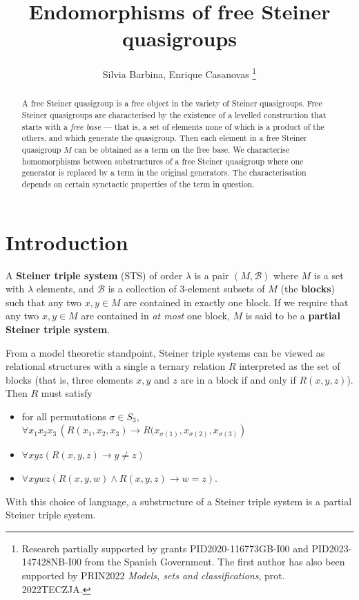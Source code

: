 \documentclass[a4paper, 11pt]{article}
\title{Endomorphisms of free Steiner quasigroups}
\author{Silvia Barbina,  Enrique Casanovas \thanks{Research partially supported by grants PID2020-116773GB-I00 and PID2023-147428NB-I00 from the Spanish Government. The first author has also been supported by PRIN2022 \textit{Models, sets and classifications}, prot. 2022TECZJA.}}
\theoremstyle{note}
\begin{document}
		\maketitle
	\begin{abstract}
 A free Steiner quasigroup is a free object in the variety of Steiner quasigroups. Free Steiner quasigroups are characterised by the existence of a levelled construction that starts with a \textit{free base} --- that is, a set of elements none of which is a product of the others, and which generate the quasigroup. Then each element in a free Steiner quasigroup $M$ can be obtained as a term on the free base. We characterise homomorphisms between substructures of a free Steiner quasigroup where one generator is replaced by a term in the original generators. The characterisation depends on certain synctactic properties of the term in question.
	\end{abstract}
	\section{Introduction}



A \textbf{Steiner triple system} (STS) of order $\lambda$ is a pair $(M, \mathcal{B})$ where $M$ is a set with $\lambda$ elements, and 
 $\mathcal{B}$ is a collection of 3-element subsets of $M$ (the \textbf{blocks})
such that any two $x, y \in M$ are contained in exactly one block. If we require that any two $x,y \in M$ are contained in \textit{at most }one block, $M$ is said to be a  \textbf{partial Steiner triple system}.

From a model theoretic standpoint, Steiner triple systems can be viewed as relational structures with a single a ternary relation $R$ interpreted as the set of blocks (that is, three elements $x, y$ and $z$ are in a block if and only if $R(x,y,z)$). Then $R$ must satisfy
\begin{itemize}
\item for all permutations $\sigma \in S_3$, $ \forall x_1 x_2 x_3 \, \left(R(x_1, x_2, x_3) \rightarrow R(x_{\sigma(1)}, x_{\sigma(2)}, x_{\sigma(3)} \right)$
\item $\forall x y z \left( R(x,y,z) \rightarrow y\neq z \right)$
\item $\forall x y w z \left( R(x,y,w) \wedge R(x,y,z) \rightarrow w=z \right)$.
\end{itemize}
With this choice of language, a substructure of a Steiner triple system is a partial Steiner triple system.
\end{document}
